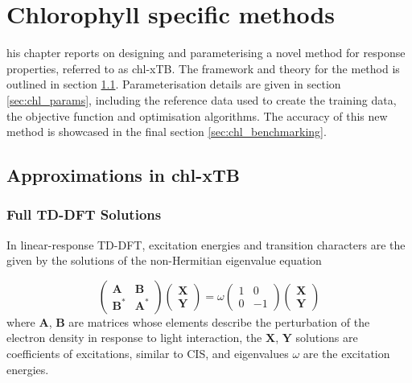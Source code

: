 %
%
\let\textcircled=\pgftextcircled
\chapter{Chlorophyll specific methods}
\label{chap:chl_xtb}

his chapter reports on designing and parameterising a novel method for
response properties, referred to as chl-xTB. The framework and theory for the method
is outlined in section \ref{sec:theory}. Parameterisation details are given in section \ref{sec:chl_params},
including the reference data used to create the training data, the objective function
and optimisation algorithms. The accuracy of this new method is showcased in the
final section \ref{sec:chl_benchmarking}.

\section{Approximations in chl-xTB}
\label{sec:theory}

\subsection{Full TD-DFT Solutions}
\label{subsec:tddft_equation}
In linear-response TD-DFT, excitation energies and transition characters are the
given by the solutions of the non-Hermitian eigenvalue equation

\begin{equation}
    \begin{pmatrix}
        \mathbf{A}   & \mathbf{B} \\
        \mathbf{B}^\ast  & \mathbf{A}^\ast
    \end{pmatrix}
    \begin{pmatrix}
        \mathbf{X} \\
        \mathbf{Y}
    \end{pmatrix}
    = 
    \omega
    \begin{pmatrix}
        1 & 0 \\
        0 & -1
    \end{pmatrix}
    \begin{pmatrix}
        \mathbf{X} \\
        \mathbf{Y}
    \end{pmatrix}
\end{equation}
%
where $\mathbf{A}$, $\mathbf{B}$ are matrices whose elements describe the perturbation
of the electron density in response to light interaction, the $\mathbf{X}$, $\mathbf{Y}$
solutions are coefficients of excitations, similar to CIS, and eigenvalues $\omega$
are the excitation energies.

